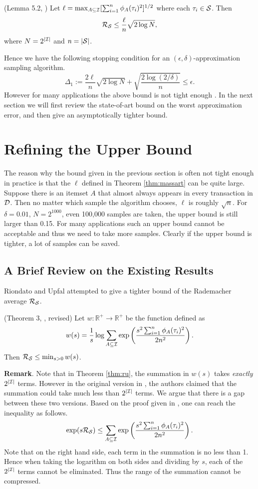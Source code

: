 \documentclass{article}
\begin{document}
\begin{theorem}
\label{thm:massart}
(Lemma 5.2, \cite{Mas00}) Let $\ell = \max_{A\subseteq\mathcal{I}} [\sum_{i=1}^n\phi_A(\tau_i)^2]^{1/2}$ where each $\tau_i\in\mathcal{S}$. Then
$$\mathcal{R}_{\mathcal{S}} \leq \frac{\ell}{n}\sqrt{2\log N},$$
where $N = 2^{|\mathcal{I}|}$ and $n = |\mathcal{S}|$.
\end{theorem}
Hence we have the following stopping condition for an $(\epsilon,\delta)$-approximation sampling algorithm.
$$\Delta_1 := \frac{2\ell}{n}\sqrt{2\log N} + \sqrt{\frac{2\log(2/\delta)}{n}} \leq \epsilon.$$
However for many applications the above bound is not tight enough \cite{RU15,RU16}. In the next section we will first review the state-of-art bound on the worst approximation error, and then give an asymptotically tighter bound.

\section{Refining the Upper Bound}
\label{sec:refine}
The reason why the bound given in the previous section is often not tight enough in practice is that the $\ell$ defined in Theorem \ref{thm:massart} can be quite large. Suppose there is an itemset $A$ that almost always appears in every transaction in $\mathcal{D}$. Then no matter which sample the algorithm chooses, $\ell$ is roughly $\sqrt{n}$. For $\delta=0.01$, $N = 2^{1000}$, even 100,000 samples are taken, the upper bound is still larger than 0.15. For many applications such an upper bound cannot be acceptable and thus we need to take more samples. Clearly if the upper bound is tighter, a lot of samples can be saved.

\subsection{A Brief Review on the Existing Results}
Riondato and Upfal \cite{RU15} attempted to give a tighter bound of the Rademacher average $\mathcal{R}_{\mathcal{S}}$. 

\begin{theorem}
\label{thm:ru}
(Theorem 3, \cite{RU15}, revised) Let $w : \mathbb{R}^+ \to \mathbb{R}^+$ be the function defined as
$$w(s) = \frac{1}{s}\log \sum_{A\subseteq\mathcal{I}}\exp\left(\frac{s^2 \sum_{i=1}^n \phi_A(\tau_i)^2}{2n^2}\right).$$
Then $\mathcal{R}_{\mathcal{S}} \leq \min_{s>0} w(s)$.
\end{theorem}

{\bf Remark}. Note that in Theorem \ref{thm:ru}, the summation in $w(s)$ takes \emph{exactly} $2^{|\mathcal{I}|}$ terms. However in the original version in \cite{RU15}, the authors claimed that the summation could take much less than $2^{|\mathcal{I}|}$ terms. We argue that there is a gap between these two versions. Based on the proof given in \cite{RU15}, one can reach the inequality as follows.
\begin{equation}
\label{eqn:ru}\exp(s\mathcal{R}_{\mathcal{S}}) \leq \sum_{A\subseteq\mathcal{I}}\exp\left(\frac{s^2\sum_{i=1}^n \phi_A(\tau_i)^2}{2n^2}\right).
\end{equation}
Note that on the right hand side, each term in the summation is no less than 1. Hence when taking the logarithm on both sides and dividing by $s$, each of the $2^{|\mathcal{I}|}$ terms cannot be eliminated. Thus the range of the summation cannot be compressed.
\end{document}
